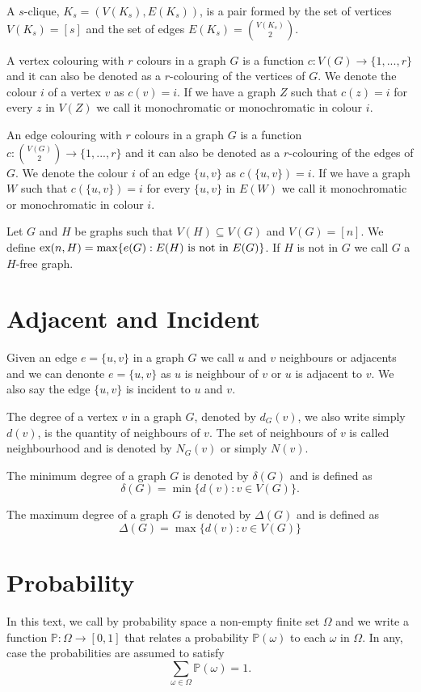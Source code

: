 \documentclass[12pt,twoside,a4paper,bibliography=totocnumbered]{book}
\numberwithin{equation}{section}
\theoremstyle{remark}
\def\ex{\mathop{\text{\rm ex}}\nolimits}
\begin{document}
A $s$-clique, $K_s = (V(K_s),E(K_s))$, is a pair formed by the set of vertices $V(K_s) =  [s]$ and the set of edges $E(K_s) = \binom{V(K_s)}{2}$.

A vertex colouring with $r$ colours in a graph $G$ is a function $c\colon V(G) \rightarrow \{1,...,r\}$ and it can also be denoted as a $r$-colouring of the vertices of $G$. We denote the colour $i$ of a vertex $v$ as $c(v)=i$. If we have a graph $Z$ such that $c(z)=i$ for every $z$ in $V(Z)$ we call it monochromatic or monochromatic in colour $i$.


An edge colouring with $r$ colours in a graph $G$ is a function $c\colon \binom{V(G)}{2} \rightarrow \{1,...,r\}$ and it can also be denoted as a $r$-colouring of the edges of $G$. We denote the colour $i$ of an edge $\{u,v\}$ as $c(\{u,v\})=i$. If we have a graph $W$ such that $c(\{u,v\})=i$ for every $\{u,v\}$ in $E(W)$ we call it monochromatic or monochromatic in colour $i$.

Let $G$ and $H$ be graphs such that $V(H) \subseteq V(G)$ and $V(G)= [n]$. We define $\ex(n,H) = \max\{e(G): E(H)\text{ is not in }E(G)\}$. If $H$ is not in $G$ we call $G$ a $H$-free graph.

\section{Adjacent and Incident}
Given an edge $e =\{u,v\}$ in a graph $G$ we call $u$ and $v$ neighbours or adjacents and we can denonte $e =\{u,v\}$ as $u$ is neighbour of $v$ or $u$ is adjacent to $v$. We also say the edge $\{u,v\}$ is incident to $u$ and $v$.

The degree of a vertex $v$ in a graph $G$, denoted by $d_G(v)$, we also write simply $d(v)$, is the quantity of neighbours of $v$. The set of neighbours of $v$ is called neighbourhood and is denoted by $N_G(v)$ or simply $N(v)$.

The minimum degree of a graph $G$ is denoted by $\delta(G)$ and is defined as
$$\delta(G) = \min\{d(v) \colon v \in V (G)\}.$$

The maximum degree of a graph $G$ is denoted by $\Delta(G)$ and is defined as 
$$ \Delta(G) = \max\{d(v) \colon v \in V(G)\} $$

\section{Probability}
In this text, we call by probability space a non-empty finite set $\Omega$ and we write a function $\mathbb{P}\colon \Omega \rightarrow [0,1]$ that relates a probability $\mathbb{P}(\omega)$ to each $\omega$ in $\Omega$. In any, case the probabilities are assumed to satisfy
$$ \sum_{\omega \in \Omega} \mathbb{P}(\omega) = 1.$$
\end{document}
